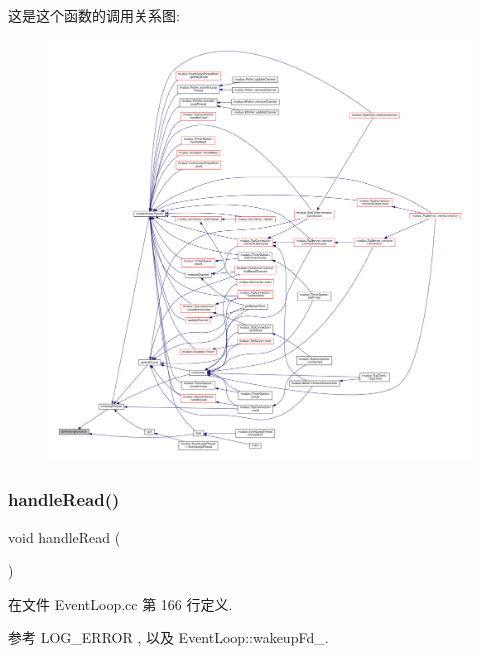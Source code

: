 这是这个函数的调用关系图\+:
\nopagebreak
\begin{figure}[H]
\begin{center}
\leavevmode
\includegraphics[width=350pt]{classmuduo_1_1EventLoop_a52b9d01f6df5ea016514b924abda1299_icgraph}
\end{center}
\end{figure}
\mbox{\label{classmuduo_1_1EventLoop_a231ec0ec0313193a59b3f1326328ae50}} 
\subsubsection{\texorpdfstring{handle\+Read()}{handleRead()}}
{\footnotesize\ttfamily void handle\+Read (\begin{DoxyParamCaption}{ }\end{DoxyParamCaption})\hspace{0.3cm}{\ttfamily [private]}}



在文件 Event\+Loop.\+cc 第 166 行定义.



参考 L\+O\+G\+\_\+\+E\+R\+R\+OR , 以及 Event\+Loop\+::wakeup\+Fd\+\_\+.



